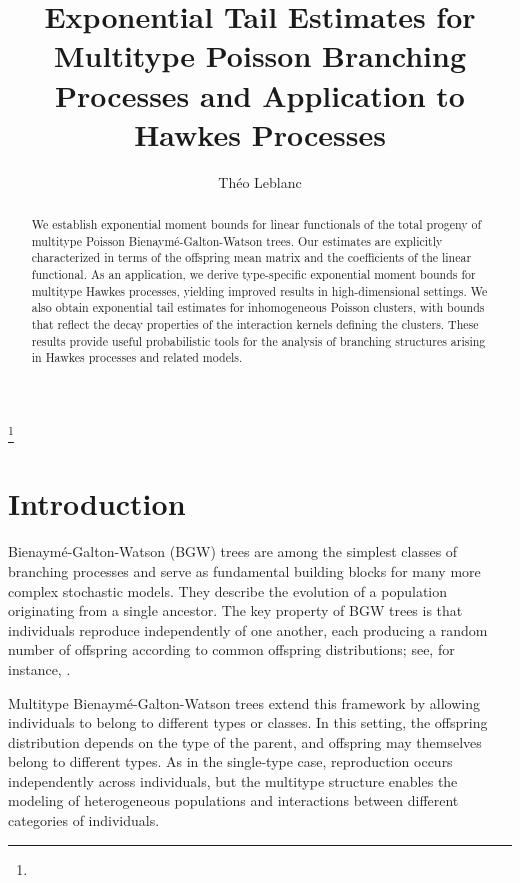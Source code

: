 \documentclass[reqno,final,11pt]{amsart}
\renewcommand{\cite}{\citet}
\theoremstyle{plain}
\theoremstyle{definition}
\theoremstyle{remark}
\begin{document}
\title[Exponential Tail Estimates for Poisson Branching Processes]{Exponential Tail Estimates for Multitype Poisson Branching Processes and Application to Hawkes Processes}

\author{Théo Leblanc}
\address{CEREMADE, Université Paris Dauphine - PSL}

\thanks{}


\begin{abstract}
	We establish exponential moment bounds for linear functionals of the total progeny of multitype Poisson Bienaymé-Galton-Watson trees. Our estimates are explicitly characterized in terms of the offspring mean matrix and the coefficients of the linear functional. As an application, we derive type-specific exponential moment bounds for multitype Hawkes processes, yielding improved results in high-dimensional settings. We also obtain exponential tail estimates for inhomogeneous Poisson clusters, with bounds that reflect the decay properties of the interaction kernels defining the clusters. These results provide useful probabilistic tools for the analysis of branching structures arising in Hawkes processes and related models.
\end{abstract}

\maketitle

\section{Introduction}

Bienaymé-Galton-Watson (BGW) trees are among the simplest classes of branching processes and serve as fundamental building blocks for many more complex stochastic models. They describe the evolution of a population originating from a single ancestor. The key property of BGW trees is that individuals reproduce independently of one another, each producing a random number of offspring according to common offspring distributions; see, for instance, \cite{athreya_branching_1972,harris_theory_1963}.

Multitype Bienaymé-Galton-Watson trees extend this framework by allowing individuals to belong to different types or classes. In this setting, the offspring distribution depends on the type of the parent, and offspring may themselves belong to different types. As in the single-type case, reproduction occurs independently across individuals, but the multitype structure enables the modeling of heterogeneous populations and interactions between different categories of individuals.
\end{document}
